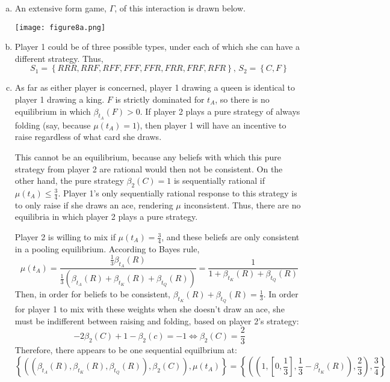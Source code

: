 \documentclass{article}
\begin{document}
\begin{enumerate}[(a)]
	\item An extensive form game, $\Gamma$, of this interaction is drawn below.
		\begin{center}
			\texttt{[image: figure8a.png]}
		\end{center}
	
	\item Player 1 could be of three possible types, under each of which she can have a different strategy. Thus,
	\[
		S_1 = \left\{RRR,RRF,RFF,FFF,FFR,FRR,FRF,RFR\right\}\text{, }S_2 = \left\{C,F\right\}
	\]
	
	\item As far as either player is concerned, player 1 drawing a queen is identical to player 1 drawing a king. $F$ is strictly dominated for $t_A$, so there is no equilibrium in which ${\beta_{t_A}(F)>0}$. If player 2 plays a pure strategy of always folding (say, because ${\mu(t_A)=1}$), then player 1 will have an incentive to raise regardless of what card she draws. 
	
	This cannot be an equilibrium, because any beliefs with which this pure strategy from player 2 are rational would then not be consistent. On the other hand, the pure strategy ${\beta_2(C)=1}$ is sequentially rational if ${\mu(t_A)\leq \frac{3}{4}}$. Player 1's only sequentially rational response to this strategy is to only raise if she draws an ace, rendering $\mu$ inconsistent. Thus, there are no equilibria in which player 2 plays a pure strategy.

	Player 2 is willing to mix if ${\mu(t_A) = \frac{3}{4}}$, and these beliefs are only consistent in a pooling equilibrium. According to Bayes rule,
		\[
			\mu(t_A) = \frac{\frac{1}{3}\beta_{t_A}(R)}{\frac{1}{3}\left(\beta_{t_A}(R)+\beta_{t_K}(R)+\beta_{t_Q}(R)\right)}
				= \frac{1}{1+\beta_{t_K}(R)+\beta_{t_Q}(R)}
		\]
	Then, in order for beliefs to be consistent, ${\beta_{t_K}(R)+\beta_{t_Q}(R)=\frac{1}{3}}$. In order for player 1 to mix with these weights when she doesn't draw an ace, she must be indifferent between raising and folding, based on player 2's strategy:
		\[
			-2\beta_2(C)+1-\beta_2(c) = -1 \iff \beta_2(C) = \frac{2}{3}
		\]
	Therefore, there appears to be one sequential equilbrium at:
		\[
			\left\{\left(\left(\beta_{t_A}(R),\beta_{t_K}(R),\beta_{t_Q}(R)\right),\beta_2(C)\right),\mu(t_A)\right\} = \left\{\left(\left(1,\left[0,\frac{1}{3}\right],\frac{1}{3}-\beta_{t_K}(R)\right),\frac{2}{3}\right),\frac{3}{4}\right\}
		\]
\end{enumerate}

\end{document}
